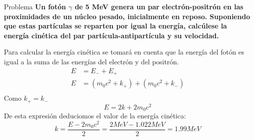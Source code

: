 \documentclass{beamer}
\begin{document}
\begin{frame}{Problema}
    \textbf{ Un fot\'on $\gamma$ de 5 MeV genera un par electr\'on-positr\'on en las proximidades de un n\'ucleo pesado, inicialmente en reposo. Suponiendo que estas part\'iculas se reparten por igual la energ\'ia, calc\'ulese la energ\'ia cin\'etica del par part\'icula-antipart\'icula y su velocidad. }
    
    Para calcular la energ\'ia cin\'etica se tomar\'a en cuenta que la energ\'ia del fot\'on es igual a la suma de las energ\'ias del electr\'on y del positr\'on.
    \begin{equation*}
        \begin{split}
            E &= E_{-} + E_{+}\\
            E &= (m_0c^2 + k_{+}) + (m_0c^2 + k_{-})\\
        \end{split}
    \end{equation*}
    Como $k_{+} = k_{-}$
    $$ E = 2k + 2m_0c^2 $$
    De esta expresi\'on deduciomos el valor de la energ\'ia cin\'etica:
    $$ k = \frac{E - 2m_0c^2}{2} = \frac{2MeV - 1.022MeV}{2} = 1.99MeV $$
    \end{frame}
\end{document}
